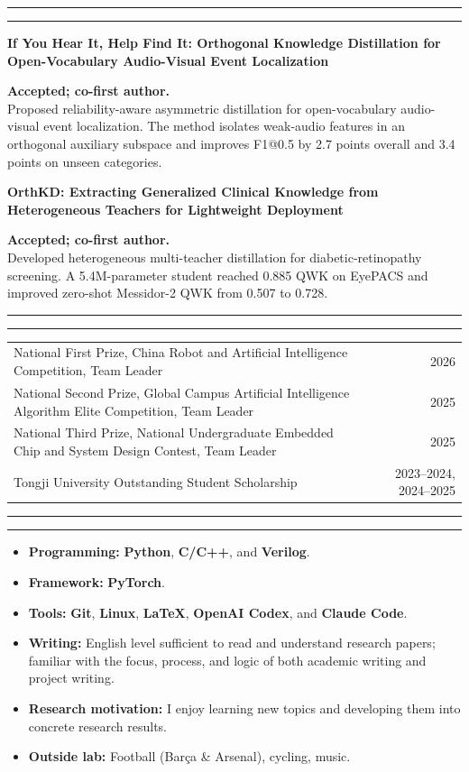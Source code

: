 \documentclass[a4paper,11pt]{article}
\newcommand{\cvicon}[1]{\textcolor{deepred}{#1}}
\newcommand{\sectionhead}[1]{%
  \vspace{5.5pt}%
  \noindent{\fontsize{14.2}{15.4}\selectfont\bfseries #1}\par\vspace{0pt}%
  {\color{deepred}\rule{2.4em}{0.7pt}}{\color{rulegray}\rule{\dimexpr\textwidth-2.4em\relax}{0.45pt}}\par\vspace{2.2pt}%
}
\newcommand{\role}[1]{\textbf{\textcolor{textgray}{#1}}}
\newcommand{\paperitem}[4]{%
  \noindent\makebox[1.0em][l]{\textcolor{markerred}{\small\faBookmark}}%
  \begin{minipage}[t]{\dimexpr\textwidth-8.0em\relax}\raggedright\textbf{#1}\end{minipage}%
  \makebox[7.0em][r]{\small\textcolor{textgray}{#2}}\par\vspace{3pt}
  \hspace*{1.0em}\begin{minipage}[t]{\dimexpr\textwidth-1.0em\relax}
    #3\\[-1pt]
    {\normalsize #4}
  \end{minipage}\par\vspace{2.5pt}
}
\begin{document}
\sectionhead{Research}
\paperitem{If You Hear It, Help Find It: Orthogonal Knowledge Distillation for Open-Vocabulary Audio-Visual Event Localization}{ACM MM 2026}
{\role{Accepted; co-first author.}}
{Proposed reliability-aware asymmetric distillation for open-vocabulary audio-visual event localization. The method isolates weak-audio features in an orthogonal auxiliary subspace and improves F1@0.5 by 2.7 points overall and 3.4 points on unseen categories.}

\paperitem{OrthKD: Extracting Generalized Clinical Knowledge from Heterogeneous Teachers for Lightweight Deployment}{IJCAI 2026}
{\role{Accepted; co-first author.}}
{Developed heterogeneous multi-teacher distillation for diabetic-retinopathy screening. A 5.4M-parameter student reached 0.885 QWK on EyePACS and improved zero-shot Messidor-2 QWK from 0.507 to 0.728.}

\sectionhead{Awards}
\begin{tabularx}{\textwidth}{@{}>{\raggedright\arraybackslash}Xr@{}}
  National First Prize, China Robot and Artificial Intelligence Competition, Team Leader & 2026 \\
  National Second Prize, Global Campus Artificial Intelligence Algorithm Elite Competition, Team Leader & 2025 \\
  National Third Prize, National Undergraduate Embedded Chip and System Design Contest, Team Leader & 2025 \\
  Tongji University Outstanding Student Scholarship & 2023--2024, 2024--2025 \\
\end{tabularx}

\sectionhead{Skills}
\begin{itemize}
  \item \role{Programming:} \textbf{Python}, \textbf{C/C++}, and \textbf{Verilog}.
  \item \role{Framework:} \textbf{PyTorch}.
  \item \role{Tools:} \textbf{Git}, \textbf{Linux}, \textbf{LaTeX}, \textbf{OpenAI Codex}, and \textbf{Claude Code}.
  \item \role{Writing:} English level sufficient to read and understand research papers; familiar with the focus, process, and logic of both academic writing and project writing.
  \item \role{Research motivation:} I enjoy learning new topics and developing them into concrete research results.
  \item \role{Outside lab:} \cvicon{\faFutbol} Football (Barça \& Arsenal), cycling, music.
\end{itemize}
\end{document}
